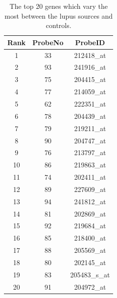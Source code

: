 \documentclass[a4paper, 12pt]{report}
\begin{document}

\begin{table}[h]
\centering
\begin{tabular}{ccc}
  \hline
Rank & ProbeNo & ProbeID \\ 
  \hline
1 &  33 & 212418\_at \\ 
  2 &  93 & 241916\_at \\ 
  3 &  75 & 204415\_at \\ 
  4 &  77 & 214059\_at \\ 
  5 &  62 & 222351\_at \\ 
  6 &  78 & 204439\_at \\ 
  7 &  79 & 219211\_at \\ 
  8 &  90 & 204747\_at \\ 
  9 &  76 & 213797\_at \\ 
  10 &  86 & 219863\_at \\ 
  11 &  74 & 202411\_at \\ 
  12 &  89 & 227609\_at \\ 
  13 &  94 & 241812\_at \\ 
  14 &  81 & 202869\_at \\ 
  15 &  92 & 219684\_at \\ 
  16 &  85 & 218400\_at \\ 
  17 &  88 & 205569\_at \\ 
  18 &  80 & 202145\_at \\ 
  19 &  83 & 205483\_s\_at \\ 
  20 &  91 & 204972\_at \\ 
   \hline
\end{tabular}
\caption{The top 20 genes which vary the most between the lupus sources and controls.} 
\label{T:DEGT}
\end{table}
\end{document}
